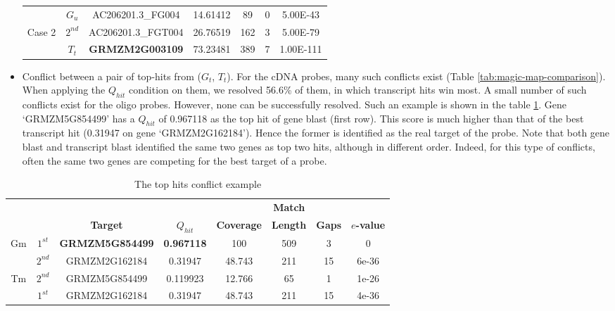 \begin{itemize}
\begin{table}[b]
\begin{footnotesize}
\begin{tabular}{@{}c|cccccc@{}}
 	\hline
 	
	& $G_u$ & AC206201.3\_FG004 & 14.61412 & 89 & 0 & 5.00E-43 \\
	Case 2 & $2^{nd}$ & AC206201.3\_FGT004 & 26.76519 & 162 & 3 & 5.00E-79 
	\\
	& $T_t$ & \textbf{GRMZM2G003109} & 73.23481 & 389 & 7 & 1.00E-111 \\
	\bottomrule
	\end{tabular}
	\end{footnotesize}
\end{table}

\item Conflict between a pair of top-hits from ($G_t$, $T_t$). For the cDNA probes, many such conflicts exist (Table \ref{tab:magic-map-comparison}). When applying the $Q_{hit}$ condition on them, we resolved 56.6\% of them, in which transcript hits win most.  A small number of such conflicts exist for the oligo probes. However, none can be successfully resolved. Such an example is shown in the table \ref{tab:magic-conflict-tops}. Gene  ‘GRMZM5G854499’ has a $Q_{hit}$ of 0.967118 as the top hit of gene blast (first row).  This score is much higher than that of the best transcript hit (0.31947 on gene ‘GRMZM2G162184’).  Hence the former is identified as the real target of the probe. Note that both gene blast and transcript blast identified the same two genes as top two hits, although in different order. Indeed, for this type of conflicts, often the same two genes are competing for the best target of a probe. 

\end{itemize}

\begin{table}
	\centering
	\begin{footnotesize}
	\caption{The top hits conflict example} 
	\label{tab:magic-conflict-tops}
	\begin{tabular}{@{}cc|cccccc@{}}
	\toprule
	& & & & & \textbf{Match} & & \\
	& & \textbf{Target} & \textbf{$Q_{hit}$} & \textbf{Coverage} & 
	\textbf{Length} & \textbf{Gaps} & \textbf{$e$-value} \\ 
	\midrule
	Gm &
	$1^{st}$ & \textbf{GRMZM5G854499} & \textbf{0.967118} & 100 & 509 & 3 & 0 \\
	& $2^{nd}$ & GRMZM2G162184 & 0.31947 & 48.743 & 211 & 15 & 6e-36 \\
	\hline
	Tm & 
	$2^{nd}$ & GRMZM5G854499 & 0.119923 & 12.766 & 65 & 1 & 1e-26 \\
	& $1^{st}$ & GRMZM2G162184 & 0.31947 & 48.743 & 211 & 15 & 4e-36 \\
	\bottomrule
	\end{tabular}
	\end{footnotesize}
\end{table}

